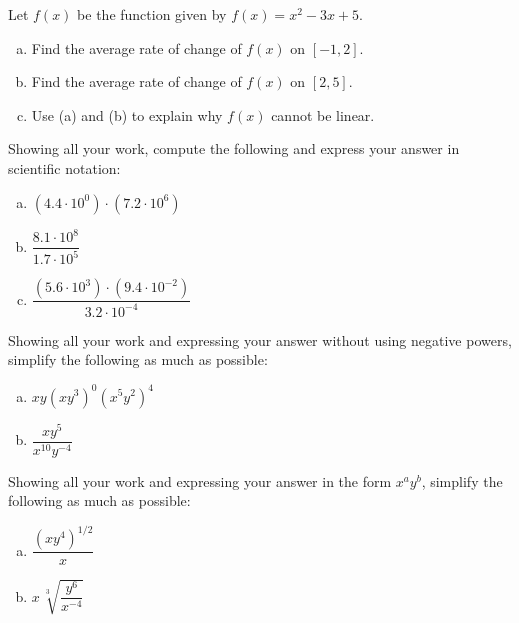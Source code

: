 \documentclass[12pt,letterpaper]{exam}
\begin{document}
\examtitle
{} 
\scores
\bottomline
\newpage


\begin{questions}

\newpage
\question[10] Let $f(x)$ be the function given by $f(x)= x^2 - 3x + 5$. 
	\begin{enumerate}[(a)]
	\item Find the average rate of change of $f(x)$ on $[-1, 2]$. 
	\item Find the average rate of change of $f(x)$ on $[2, 5]$.
	\item Use (a) and (b) to explain why $f(x)$ cannot be linear. 
	\end{enumerate} 



\newpage
\question[10] Showing all your work, compute the following and express your answer in scientific notation:
	\begin{enumerate}[(a)]
	\item $(4.4 \cdot 10^0) \cdot (7.2 \cdot 10^6)$
	\item $\dfrac{8.1 \cdot 10^8}{1.7 \cdot 10^5}$
	\item $\dfrac{(5.6 \cdot 10^3) \cdot (9.4 \cdot 10^{-2})}{3.2 \cdot 10^{-4}}$
	\end{enumerate} 



\newpage
\question[10] Showing all your work and expressing your answer without using negative powers, simplify the following as much as possible:
	\begin{enumerate}[(a)]
	\item $xy(xy^3)^0 (x^5y^2)^4$
	\item $\dfrac{x y^5}{x^{10} y^{-4}}$
	\end{enumerate} 



\newpage
\question[10] Showing all your work and expressing your answer in the form $x^a y^b$, simplify the following as much as possible:
	\begin{enumerate}[(a)]
	\item $\dfrac{(xy^4)^{1/2}}{x}$
	\item $x \, \sqrt[3]{\dfrac{y^6}{x^{-4}}}$
	\end{enumerate} 




\end{questions}
\end{document}
